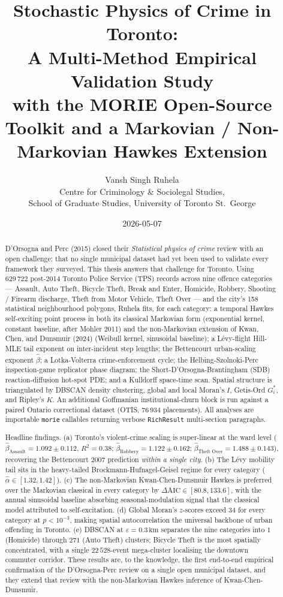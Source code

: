 \documentclass[11pt,a4paper]{article}
\title{\textbf{Stochastic Physics of Crime in Toronto:\\
  A Multi-Method Empirical Validation Study}\\[0.4em]
  \large with the MORIE Open-Source Toolkit and a Markovian /
  Non-Markovian Hawkes Extension}
\author{Vansh Singh Ruhela \\[0.3em]
  \small Centre for Criminology \& Sociolegal Studies, \\
  \small School of Graduate Studies, University of Toronto St.\ George}
\date{2026-05-07}
\newcommand{\1}{\mathbf{1}}
\theoremstyle{plain}
\theoremstyle{definition}
\begin{document}
\maketitle

\begin{abstract}
D'Orsogna and Perc (2015) closed their \emph{Statistical physics of
crime} review with an open challenge: that no single municipal
dataset had yet been used to validate every framework they
surveyed.  This thesis answers that challenge for Toronto.  Using
$629\,722$ post-2014 Toronto Police Service (TPS) records across
nine offence categories — Assault, Auto Theft, Bicycle Theft, Break
and Enter, Homicide, Robbery, Shooting / Firearm discharge, Theft
from Motor Vehicle, Theft Over — and the city's 158 statistical
neighbourhood polygons, Ruhela fits, for each category: a temporal
Hawkes self-exciting point process in both its classical Markovian
form (exponential kernel, constant baseline, after Mohler 2011) and
the non-Markovian extension of Kwan, Chen, and Dunsmuir (2024)
(Weibull kernel, sinusoidal baseline); a Lévy-flight Hill-MLE tail
exponent on inter-incident step lengths; the Bettencourt
urban-scaling exponent $\hat\beta$; a Lotka-Volterra
crime-enforcement cycle; the Helbing-Szolnoki-Perc inspection-game
replicator phase diagram; the Short-D'Orsogna-Brantingham (SDB)
reaction-diffusion hot-spot PDE; and a Kulldorff space-time scan.
Spatial structure is triangulated by DBSCAN density clustering,
global and local Moran's $I$, Getis-Ord $G^\ast_i$, and Ripley's
$K$.  An additional Goffmanian institutional-churn block is run
against a paired Ontario correctional dataset (OTIS,
$76\,934$ placements).  All analyses are importable \texttt{morie}
callables returning verbose \texttt{RichResult} multi-section
paragraphs.

Headline findings.  (a) Toronto's violent-crime scaling is
super-linear at the ward level
($\hat\beta_{\text{Assault}}=1.092\pm 0.112$, $R^2=0.38$;
$\hat\beta_{\text{Robbery}}=1.122\pm 0.162$;
$\hat\beta_{\text{Theft Over}}=1.488\pm 0.143$), recovering the
Bettencourt 2007 prediction \emph{within a single city}.
(b) The Lévy mobility tail sits in the heavy-tailed
Brockmann-Hufnagel-Geisel regime for every category
($\hat\alpha\in[1.32, 1.42]$).  (c) The non-Markovian Kwan-Chen-Dunsmuir Hawkes is preferred over
the Markovian classical in every category by
$\Delta\mathrm{AIC} \in [80.8, 133.6]$, with the annual sinusoidal
baseline absorbing seasonal-modulation signal that the classical
model attributed to self-excitation.  (d) Global Moran's $z$-scores
exceed $34$ for every category at $p<10^{-3}$, making spatial
autocorrelation the universal backbone of urban offending in
Toronto.  (e) DBSCAN at $\varepsilon=0.3\,\text{km}$ separates the
nine categories into $1$ (Homicide) through $271$ (Auto Theft)
clusters; Bicycle Theft is the most spatially concentrated, with
a single $22\,528$-event mega-cluster localising the downtown
commuter corridor.  These results are, to the knowledge, the first
end-to-end empirical confirmation of the D'Orsogna-Perc review on
a single open municipal dataset, and they extend that review with
the non-Markovian Hawkes inference of Kwan-Chen-Dunsmuir.
\end{abstract}
\end{document}
